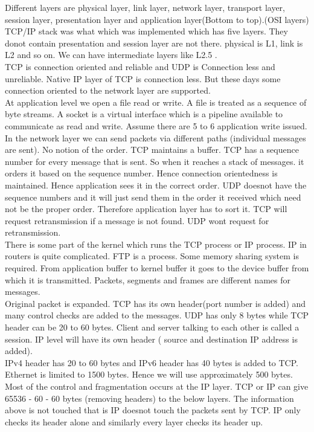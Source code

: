 \documentclass[solution,addpoints,12pt]{exam}
\begin{document}
Different layers are physical layer, link layer, network layer, transport layer,
session layer, presentation layer and application layer(Bottom to top).(OSI
layers)\\
TCP/IP stack was what which was implemented which has five layers. They donot
contain
presentation and session layer are not there. physical is L1, link is L2 and so
on.
We can have intermediate layers like L2.5 .\\
TCP is connection oriented and reliable and UDP is Connection less and
unreliable.
Native IP layer of TCP is connection less. But these days some connection
oriented to the
network layer are supported.\\

At application level we open a file read or write. A file is treated as a
sequence of
byte streams. A socket is a virtual interface which is a pipeline available to
communicate as read and
write. Assume there are 5 to 6 application write issued. In the network layer
we can send packets via
different paths (individual messages are sent). No notion of the order. TCP
maintains a buffer.
TCP has a sequence number for every message that is sent. So when it reaches a
stack of messages.
it orders it based on the sequence number. Hence connection orientedness is
maintained.
Hence application sees it in the correct order. UDP doesnot have the sequence
numbers and it
will just send them in the order it received which need not be the proper
order. Therefore
application layer has to sort it. TCP will request retransmission if a message
is not found. UDP wont request for retransmission.\\

There is some part of the kernel which runs the TCP process or IP process. IP
in routers
is quite complicated. FTP is a process. Some memory sharing system is required.
From application buffer
to kernel buffer it goes to the device buffer from which it is transmitted.
Packets, segments and frames are different names for messages.\\

Original packet is expanded. TCP has its own header(port number is added) and
many control checks are added to the messages.
UDP has only 8 bytes while TCP header can be 20 to 60 bytes. Client and server
talking to each other is called a session. IP level will have its own header (
source and destination IP address is added).\\
IPv4 header has 20 to 60 bytes and IPv6 header has 40 bytes is added to TCP.
Ethernet is limited to 1500 bytes. Hence we will use approximately 500 bytes.
Most of the control and fragmentation occurs at the IP layer. TCP or IP can
give 65536 - 60 - 60 bytes (removing headers) to the below layers.
The information above is not touched that is IP doesnot touch the packets sent
by TCP. IP only checks its
header alone and similarly every layer checks its header up.\\
\end{document}
